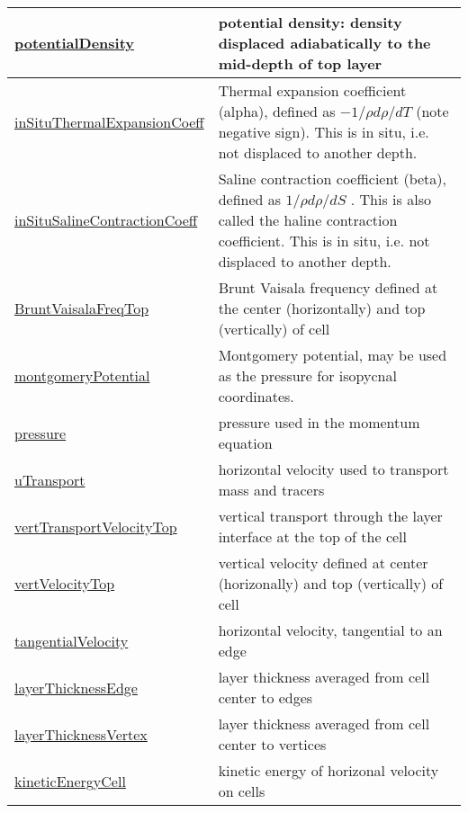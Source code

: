 {\begin{center}
\begin{longtable}{| p{2.0in} | p{4.0in} |}
	\hline
	\hyperref[subsec:var_sec_diagnostics_potentialDensity]{potentialDensity} & potential density: density displaced adiabatically to the mid-depth of top layer \\
	\hline
	\hyperref[subsec:var_sec_diagnostics_inSituThermalExpansionCoeff]{inSituThermalExpansionCoeff} &  Thermal expansion coefficient (alpha), defined as  $-1/\rho d\rho/dT$  (note negative sign).  This is in situ, i.e. not displaced to another depth. \\
	\hline
	\hyperref[subsec:var_sec_diagnostics_inSituSalineContractionCoeff]{inSituSalineContractionCoeff} &  Saline contraction coefficient (beta), defined as  $1/\rho d\rho/dS$ .  This is also called the haline contraction coefficient.  This is in situ, i.e. not displaced to another depth. \\
	\hline
	\hyperref[subsec:var_sec_diagnostics_BruntVaisalaFreqTop]{BruntVaisalaFreqTop} & Brunt Vaisala frequency defined at the center (horizontally) and top (vertically) of cell \\
	\hline
	\hyperref[subsec:var_sec_diagnostics_montgomeryPotential]{montgomeryPotential} & Montgomery potential, may be used as the pressure for isopycnal coordinates. \\
	\hline
	\hyperref[subsec:var_sec_diagnostics_pressure]{pressure} & pressure used in the momentum equation \\
	\hline
	\hyperref[subsec:var_sec_diagnostics_uTransport]{uTransport} & horizontal velocity used to transport mass and tracers \\
	\hline
	\hyperref[subsec:var_sec_diagnostics_vertTransportVelocityTop]{vertTransportVelocityTop} & vertical transport through the layer interface at the top of the cell \\
	\hline
	\hyperref[subsec:var_sec_diagnostics_vertVelocityTop]{vertVelocityTop} & vertical velocity defined at center (horizonally) and top (vertically) of cell \\
	\hline
	\hyperref[subsec:var_sec_diagnostics_tangentialVelocity]{tangentialVelocity} & horizontal velocity, tangential to an edge \\
	\hline
	\hyperref[subsec:var_sec_diagnostics_layerThicknessEdge]{layerThicknessEdge} & layer thickness averaged from cell center to edges \\
	\hline
	\hyperref[subsec:var_sec_diagnostics_layerThicknessVertex]{layerThicknessVertex} & layer thickness averaged from cell center to vertices \\
	\hline
	\hyperref[subsec:var_sec_diagnostics_kineticEnergyCell]{kineticEnergyCell} & kinetic energy of horizonal velocity on cells \\

\end{longtable}
\end{center}}
